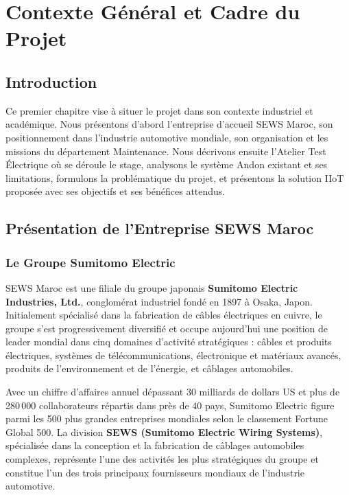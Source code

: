 ﻿%
\chapter{Contexte Général et Cadre du Projet}

\section*{Introduction}

Ce premier chapitre vise à situer le projet dans son contexte industriel et académique. Nous présentons d'abord l'entreprise d'accueil SEWS Maroc, son positionnement dans l'industrie automotive mondiale, son organisation et les missions du département Maintenance. Nous décrivons ensuite l'Atelier Test Électrique où se déroule le stage, analysons le système Andon existant et ses limitations, formulons la problématique du projet, et présentons la solution IIoT proposée avec ses objectifs et ses bénéfices attendus.

\section{Présentation de l'Entreprise SEWS Maroc}

\subsection{Le Groupe Sumitomo Electric}

SEWS Maroc est une filiale du groupe japonais \textbf{Sumitomo Electric Industries, Ltd.}, conglomérat industriel fondé en 1897 à Osaka, Japon. Initialement spécialisé dans la fabrication de câbles électriques en cuivre, le groupe s'est progressivement diversifié et occupe aujourd'hui une position de leader mondial dans cinq domaines d'activité stratégiques : câbles et produits électriques, systèmes de télécommunications, électronique et matériaux avancés, produits de l'environnement et de l'énergie, et câblages automobiles\cite{sumitomo_electric}.

Avec un chiffre d'affaires annuel dépassant 30 milliards de dollars US et plus de 280\,000 collaborateurs répartis dans près de 40 pays, Sumitomo Electric figure parmi les 500 plus grandes entreprises mondiales selon le classement Fortune Global 500. La division \textbf{SEWS (Sumitomo Electric Wiring Systems)}, spécialisée dans la conception et la fabrication de câblages automobiles complexes, représente l'une des activités les plus stratégiques du groupe et constitue l'un des trois principaux fournisseurs mondiaux de l'industrie automotive.

